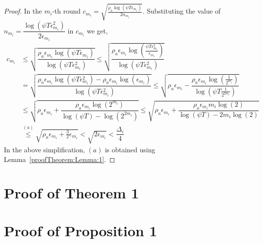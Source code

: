 \begin{proof}
In the $m_i$-th round $c_{m_i} =\sqrt{\frac{\rho_{a}\log (\psi T\epsilon_{m_{i}})}{2 n_{m_i}}}$. Substituting the value of $n_{m_i}=\dfrac{\log{(\psi T\epsilon_{m_{i}}^{2})}}{2\epsilon_{m_{i}}}$ in $c_{m_i}$ we get,
\begin{align*}
	c_{m_i} &\leq \sqrt{\dfrac{\rho_a \epsilon_{m_{i}}\log (\psi T\epsilon_{m_{i}})}{\log(\psi T\epsilon_{m_{i}}^{2})}} \leq \sqrt{\dfrac{\rho_a \epsilon_{m_{i}}\log (\frac{\psi T\epsilon_{m_{i}}^{2}}{\epsilon_{m_{i}}})}{\log(\psi T\epsilon_{m_{i}}^{2})}} \\
	& = \sqrt{\dfrac{\rho_a\epsilon_{m_{i}}\log (\psi T\epsilon_{m_{i}}^{2}) - \rho_a\epsilon_{m_{i}}\log (\epsilon_{m_{i}})}{\log(\psi T\epsilon_{m_{i}}^{2})}} 
	\leq  \sqrt{\rho_a\epsilon_{m_{i}} - \dfrac{\rho_a\epsilon_{m_i}\log(\frac{1}{2^{m_i}})}{\log(\psi T \frac{1}{2^{2m_i}})}} \\
	&\leq \sqrt{\rho_a\epsilon_{m_{i}} + \dfrac{\rho_a\epsilon_{m_i}\log(2^{m_i})}{\log(\psi T) - \log( 2^{2m_i})}}  \leq \sqrt{\rho_a\epsilon_{m_{i}} + \dfrac{\rho_a\epsilon_{m_i}m_i \log(2)}{\log(\psi T) - 2m_i\log( 2)}} \\ 
	 & \overset{(a)}{\leq} \sqrt{\rho_a\epsilon_{m_{i}} + \frac{3}{2}\epsilon_{m_i}} 
	  < \sqrt{2\epsilon_{m_i}} 
	  < \dfrac{\Delta_{i}}{4} 
	\end{align*}
In the above simplification, $(a)$ is obtained using Lemma~\ref{proofTheorem:Lemma:1}. 
\end{proof}



\section{Proof of Theorem 1}
\label{sec:proofTheorem}





\section{Proof of Proposition 1}
\label{App:A}

